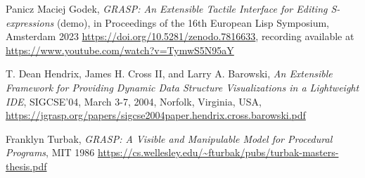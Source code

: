 \documentclass[acmsmall]{acmart}
\begin{document}
\begin{thebibliography}{8}
 Panicz Maciej Godek, \emph{GRASP: An Extensible
Tactile Interface for Editing S-expressions} (demo), in Proceedings of the
  16th European Lisp Symposium, Amsterdam 2023
  \url{https://doi.org/10.5281/zenodo.7816633}, recording available at
  \url{https://www.youtube.com/watch?v=TymwS5N95aY}

 T. Dean Hendrix, James H. Cross II, and Larry
  A. Barowski, \emph{An Extensible Framework for Providing Dynamic
  Data Structure Visualizations in a Lightweight IDE},  SIGCSE'04,
  March 3-7, 2004, Norfolk, Virginia, USA,
  \url{https://jgrasp.org/papers/sigcse2004paper.hendrix.cross.barowski.pdf}
  
 Franklyn Turbak, \emph{GRASP: A Visible and
Manipulable Model for Procedural Programs}, MIT 1986
  \url{https://cs.wellesley.edu/~fturbak/pubs/turbak-masters-thesis.pdf}
  
\end{thebibliography}
\end{document}
